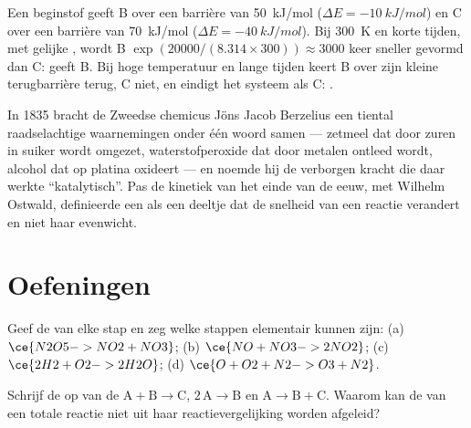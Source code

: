 \begin{example}\label{ex:b1:elementary-steps:control}
Een beginstof geeft B over een barrière van \qty{50}{kJ/mol} ($\Delta E =
\qty{-10}{kJ/mol}$) en C over een barrière van \qty{70}{kJ/mol}
($\Delta E =
\qty{-40}{kJ/mol}$). Bij \qty{300}{K} en korte tijden, met gelijke
, wordt B $\exp(20000/(8.314 \times 300)) \approx
3000$ keer sneller gevormd dan C:  geeft B. Bij hoge
temperatuur en lange tijden keert B over zijn kleine terugbarrière terug,
C niet, en eindigt het systeem als C: .
\end{example}

\begin{history}[Katalyse, 1835]
In 1835 bracht de Zweedse chemicus Jöns Jacob Berzelius een tiental
raadselachtige waarnemingen onder één woord samen --- zetmeel dat door
zuren in suiker wordt omgezet, waterstofperoxide dat door metalen
ontleed wordt, alcohol dat op platina oxideert --- en noemde hij de
verborgen kracht die daar werkte ``katalytisch''. Pas de kinetiek van het
einde van de eeuw, met Wilhelm Ostwald, definieerde een  als
een deeltje dat de snelheid van een reactie verandert en niet haar
evenwicht.
\end{history}

\section{Oefeningen}

\begin{exercise}[$\star$]\label{exo:b1:elementary-steps:1}
Geef de  van elke stap en zeg welke stappen elementair
kunnen zijn:
(a) $\ce{N2O5 -> NO2 + NO3}$; (b) $\ce{NO + NO3 -> 2NO2}$;
(c) $\ce{2H2 + O2 -> 2H2O}$; (d) $\ce{O + O2 + N2 -> O3 + N2}$.
\end{exercise}

\begin{exercise}[$\star$]\label{exo:b1:elementary-steps:2}
Schrijf de  op van de  $\mathrm{A} + \mathrm{B} \to
\mathrm{C}$, $2\,\mathrm{A} \to \mathrm{B}$ en $\mathrm{A} \to \mathrm{B} +
\mathrm{C}$. Waarom kan de  van een totale reactie niet uit
haar reactievergelijking worden afgeleid?
\end{exercise}

